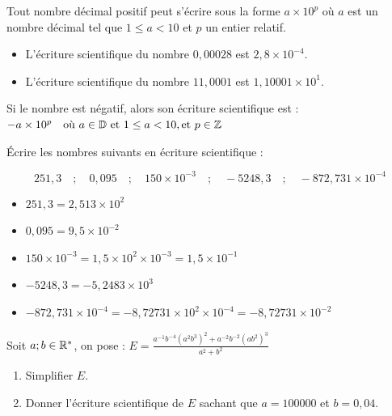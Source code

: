 \documentclass[10pt, a4paper]{article}
\begin{document}
\begin{Definition}

Tout nombre décimal positif peut s'écrire sous la forme $a \times 10^p$ où $a$ est un nombre décimal tel que $1 \leq a < 10$ et $p$ un entier relatif.
\end{Definition}

\begin{Exemple}[][5 min]
\begin{itemize}
    \item L'écriture scientifique du nombre $0{,}00028$ est $2{,}8 \times 10^{-4}$.
    \item L'écriture scientifique du nombre $11{,}0001$ est $1{,}10001 \times 10^{1}$.
\end{itemize}
\end{Exemple}

\begin{Remarque}
Si le nombre est négatif, alors son écriture scientifique est :
    $-a \times 10^p \quad \text{où} ~ a \in \mathbb{D} ~ \text{et} ~ 1 \leq a < 10, \text{et} ~ p \in \mathbb{Z}$
\end{Remarque}


\begin{Application}[][10 min]
Écrire les nombres suivants en écriture scientifique :

\[
251{,}3 \quad ; \quad 0{,}095  \quad ; \quad 150 \times 10^{-3} \quad ; \quad -5248{,}3 \quad ; \quad -872{,}731 \times 10^{-4}
\]
\end{Application}

\begin{Solution}[APPLICATION][9]
\begin{itemize}
    \item $251{,}3 = 2{,}513 \times 10^{2}$
    \item $0{,}095 = 9{,}5 \times 10^{-2}$
    \item $150 \times 10^{-3} = 1{,}5 \times 10^{2} \times 10^{-3} = 1{,}5 \times 10^{-1}$
    \item $-5248{,}3 = -5{,}2483 \times 10^{3}$
    \item $-872{,}731 \times 10^{-4} = -8{,}72731 \times 10^{2} \times 10^{-4} = -8{,}72731 \times 10^{-2}$
\end{itemize}
\end{Solution}

\begin{Application}[][10 min]
Soit $a ; b \in \mathbb{R}^*$, on pose : \quad
$E = \frac{a^{-1}b^{-4}\left(a^2b^3\right)^2 + a^{-2}b^{-2}\left(ab^2\right)^3}{a^2 + b^2}$
\begin{enumerate}
    \item Simplifier $E$.
    \item Donner l'écriture scientifique de $E$ sachant que $a = 100000$ et $b = 0{,}04$.
\end{enumerate}
\end{Application}
\end{document}
